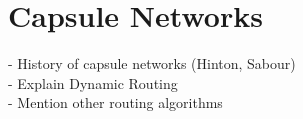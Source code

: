 
\section{Capsule Networks}
- History of capsule networks (Hinton, Sabour) \\
- Explain Dynamic Routing \\
- Mention other routing algorithms \\
